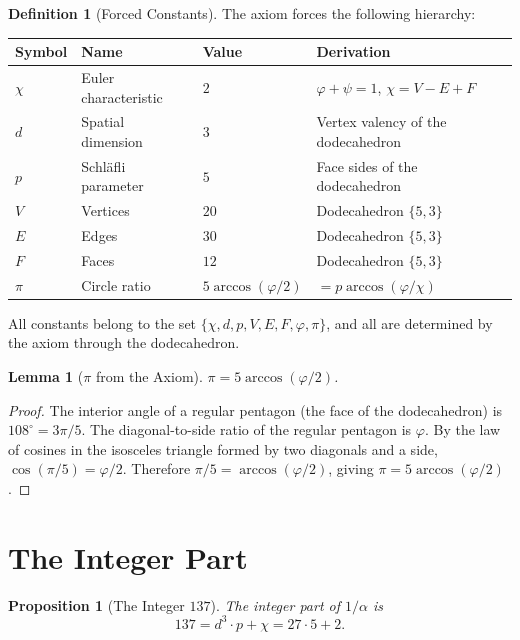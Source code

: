 \documentclass[11pt,a4paper]{article}
\theoremstyle{plain}
\newtheorem{lemma}[theorem]{Lemma}
\newtheorem{proposition}[theorem]{Proposition}
\theoremstyle{definition}
\newtheorem{definition}[theorem]{Definition}
\newcommand{\vp}{\varphi}
\begin{document}
\begin{definition}[Forced Constants]\label{def:forced}
The axiom forces the following hierarchy:
\begin{center}
\begin{tabular}{@{}llll@{}}
\toprule
Symbol & Name & Value & Derivation \\
\midrule
$\chi$ & Euler characteristic & $2$ & $\vp + \psi = 1$, $\chi = V - E + F$ \\
$d$ & Spatial dimension & $3$ & Vertex valency of the dodecahedron \\
$p$ & Schl\"afli parameter & $5$ & Face sides of the dodecahedron \\
$V$ & Vertices & $20$ & Dodecahedron $\{5,3\}$ \\
$E$ & Edges & $30$ & Dodecahedron $\{5,3\}$ \\
$F$ & Faces & $12$ & Dodecahedron $\{5,3\}$ \\
$\pi$ & Circle ratio & $5\arccos(\vp/2)$ & $= p\arccos(\vp/\chi)$ \\
\bottomrule
\end{tabular}
\end{center}
All constants belong to the set $\{\chi, d, p, V, E, F, \vp, \pi\}$,
and all are determined by the axiom through the dodecahedron.
\end{definition}

\begin{lemma}[$\pi$ from the Axiom]\label{lem:pi}
$\pi = 5\arccos(\vp/2)$.
\end{lemma}

\begin{proof}
The interior angle of a regular pentagon (the face of the dodecahedron)
is $108^\circ = 3\pi/5$.  The diagonal-to-side ratio of the regular
pentagon is $\vp$.  By the law of cosines in the isosceles triangle
formed by two diagonals and a side, $\cos(\pi/5) = \vp/2$.  Therefore
$\pi/5 = \arccos(\vp/2)$, giving $\pi = 5\arccos(\vp/2)$.
\end{proof}

\section{The Integer Part}\label{sec:integer}

\begin{proposition}[The Integer $137$]\label{prop:137}
The integer part of $1/\alpha$ is
\[
  137 = d^3 \cdot p + \chi = 27 \cdot 5 + 2.
\]
\end{proposition}
\end{document}
